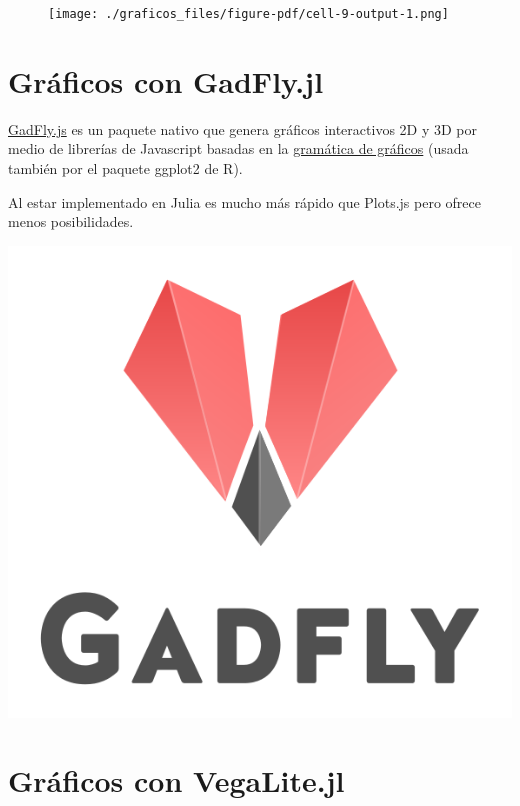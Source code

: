 \documentclass[
  letterpaper,
  DIV=11,
  numbers=noendperiod]{scrreprt}
\begin{document}
\begin{figure}[H]

{\centering \texttt{[image: ./graficos\_files/figure-pdf/cell-9-output-1.png]}

}

\end{figure}

\hypertarget{gruxe1ficos-con-gadfly.jl}{%
\section{Gráficos con GadFly.jl}\label{gruxe1ficos-con-gadfly.jl}}

\href{http://gadflyjl.org/}{GadFly.js} es un paquete nativo que genera
gráficos interactivos 2D y 3D por medio de librerías de Javascript
basadas en la
\href{https://www.cs.uic.edu/~wilkinson/TheGrammarOfGraphics/GOG.html}{gramática
de gráficos} (usada también por el paquete ggplot2 de R).

Al estar implementado en Julia es mucho más rápido que Plots.js pero
ofrece menos posibilidades.

\includegraphics{./img/logos/gadfly.svg}

\hypertarget{gruxe1ficos-con-vegalite.jl}{%
\section{Gráficos con VegaLite.jl}\label{gruxe1ficos-con-vegalite.jl}}
\end{document}
